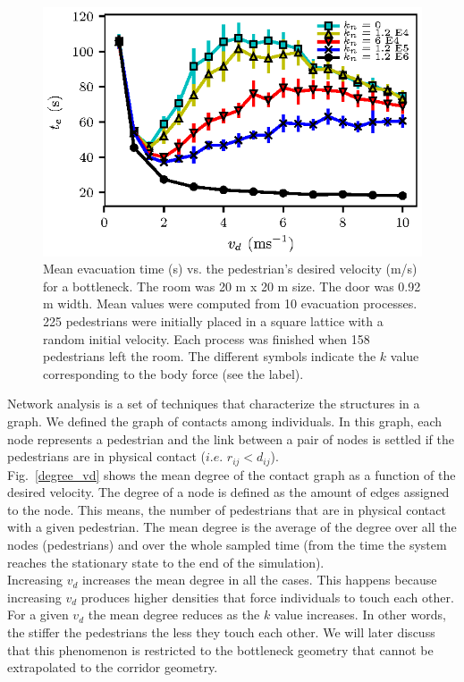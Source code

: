 \documentclass[preprint,12pt]{elsarticle}
\begin{document}
\begin{figure}[htbp!]
\centering
\includegraphics[width=0.7\columnwidth]
{./vd_vs_te_N225.eps}
\caption{\label{vd_vs_te}Mean evacuation time (s) vs. the pedestrian’s desired velocity (m/s) for a bottleneck. The room was 20 m x 20 m size. The door was 0.92 m width. Mean values were computed from 10 evacuation processes. 225 pedestrians were initially placed in a square lattice with a random initial velocity. Each process was finished when 158 pedestrians left the room. The different symbols indicate the $k$ value corresponding to the body force (see the label). }
\end{figure}


Network analysis is a set of techniques that characterize the structures in a graph. We defined the graph of contacts among individuals. In this graph, each node represents a pedestrian and the link between a pair of nodes is settled if the pedestrians are in physical contact ($i.e.$ $r_{ij}<d_{ij}$).\\

Fig.~\ref{degree_vd} shows the mean degree of the contact graph as a function of the desired velocity. The degree of a node is defined as the amount of edges assigned to the node. This means, the number of pedestrians that are in physical contact with a given pedestrian. The mean degree is the average of the degree over all the nodes (pedestrians) and over the whole sampled time (from the time the system reaches the stationary state to the end of the simulation).\\

Increasing $v_d$ increases the mean degree in all the cases. This happens because increasing $v_d$ produces higher densities that force individuals to touch each other. For a given $v_d$ the mean degree reduces as the $k$ value increases. In other words, the stiffer the pedestrians the less they touch each other. We will later discuss that this phenomenon is restricted to the bottleneck geometry that cannot be extrapolated to the corridor geometry.\\
\end{document}
